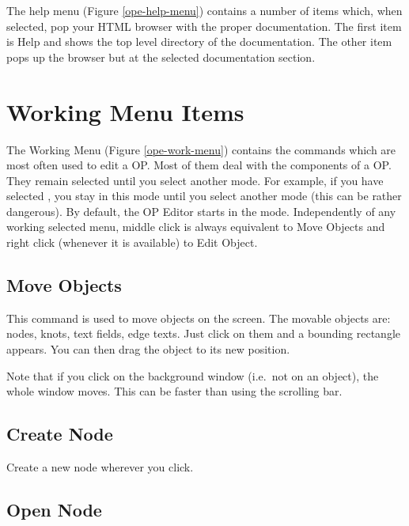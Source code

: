 The help menu (Figure \ref{ope-help-menu}) contains a number of items which,
when selected, pop your HTML browser with the proper documentation. The
first item is Help and shows the top level directory of the documentation.
The other item pops up the browser but at the selected documentation
section.

\section{Working Menu Items}


The Working Menu (Figure \ref{ope-work-menu}) contains the
commands which are most often used to edit a OP.  Most of them deal with the
components of a OP. They remain selected until you select another mode. For
example, if you have selected , you stay in this mode
until you select another mode (this can be rather dangerous). By default, the
OP Editor starts in the  mode. Independently of any working
selected menu, middle click is always equivalent to Move Objects and right
click (whenever it is available) to Edit Object.



\subsection{Move Objects}

This command is used to move objects on the screen. The movable objects
are: nodes, knots, text fields, edge texts. Just click on them and
a bounding rectangle appears. You can then drag the object to its new
position.

Note that if you click on the background window (i.e.\ not on an object),
the whole window moves. This can be faster than using the
scrolling bar.

\subsection{Create Node}

Create a new node wherever you click.

\subsection{Open Node}

